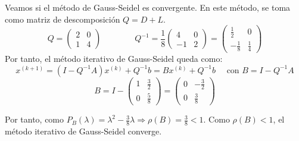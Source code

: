 \begin{ejercicio}
    Veamos si el método de Gauss-Seidel es convergente. En este método, se toma como matriz de descomposición $Q=D+L$.
    $$Q=\left( \begin{array}{cc}
        2 & 0 \\
        1 & 4
    \end{array} \right)
    \qquad \qquad
    Q^{-1}=\frac{1}{8}\left( \begin{array}{cc}
        4 & 0 \\
        -1 & 2
    \end{array} \right)=
    \left( \begin{array}{cc}
        \frac{1}{2} & 0 \\
        -\frac{1}{8} & \frac{1}{4}
    \end{array} \right)$$
    Por tanto, el método iterativo de Gauss-Seidel queda como:
    $$x^{(k+1)} = (I-Q^{-1}A)x^{(k)} + Q^{-1}b 
    =Bx^{(k)} + Q^{-1}b
    \quad \text{ con } B=I-Q^{-1}A$$
    $$B=I-\left( \begin{array}{cc}
        1 & \frac{3}{2} \\
        0 & \frac{5}{8}
    \end{array} \right)
    = \left( \begin{array}{cc}
        0 & -\frac{3}{2} \\
        0 & \frac{3}{8}
    \end{array} \right)$$

    Por tanto, como $P_B(\lambda) = \lambda^2 -\frac{3}{8}\lambda \Longrightarrow \rho(B) = {\frac{3}{8}} < 1$. Como $\rho(B)<1$, el método iterativo de Gauss-Seidel converge.
\end{ejercicio}

